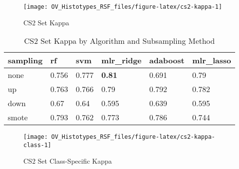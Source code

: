 \documentclass[
]{report}
\begin{document}
\begin{figure}[H]

{\centering \texttt{[image: OV\_Histotypes\_RSF\_files/figure-latex/cs2-kappa-1]} 

}

\caption{CS2 Set Kappa}\label{fig:cs2-kappa}
\end{figure}

\begin{table}

\caption{\label{tab:cs2-kappa-table}CS2 Set Kappa by Algorithm and Subsampling Method}
\centering
\begin{tabular}[t]{l|l|l|l|l|l}
\hline
sampling & rf & svm & mlr\_ridge & adaboost & mlr\_lasso\\
\hline
none & 0.756 & 0.777 & \textbf{0.81} & 0.691 & 0.79\\
\hline
up & 0.763 & 0.766 & 0.79 & 0.792 & 0.782\\
\hline
down & 0.67 & 0.64 & 0.595 & 0.639 & 0.595\\
\hline
smote & 0.793 & 0.762 & 0.773 & 0.786 & 0.744\\
\hline
\end{tabular}
\end{table}

\begin{figure}[H]

{\centering \texttt{[image: OV\_Histotypes\_RSF\_files/figure-latex/cs2-kappa-class-1]} 

}

\caption{CS2 Set Class-Specific Kappa}\label{fig:cs2-kappa-class}
\end{figure}
\end{document}
